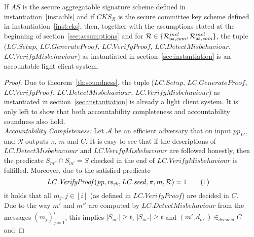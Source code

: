 \begin{theorem} 
If $\mathit{AS}$ is the secure aggregatable signature scheme defined in instantiation~\ref{insta:bls} and if 
$\mathit{CKS_{\mathcal{R}}}$ is the secure committee key scheme defined in instantiation~\ref{inst:cks}, then, together 
with the assumptions stated at the beginning of section~\ref{sec:assumptions} and for $\mathcal{R} \in \{ \mathcal{R}^{\mathit{incl}}_{\mathsf{ba},\mathit{com}}, \mathcal{R}^{\mathit{incl}}_{\mathsf{pa},\mathit{com}} \}$, the tuple 
($\mathit{LC.Setup}$, $\mathit{LC.GenerateProof}$, $\mathit{LC.VerifyProof}$, $\mathit{LC.DetectMisbehaviour}$, 
$\mathit{LC.VerifyMisbehaviour}$) as instantiated in section~\ref{sec:instantiation} is an accountable light client system.
\end{theorem}
\label{th:accountability_results}
\begin{proof}
\noindent Due to theorem~\ref{th:soundness}, the tuple 
($\mathit{LC.Setup}$, $\mathit{LC.GenerateProof}$, $\mathit{LC.VerifyProof}$, $\mathit{LC.DetectMisbehaviour}$, 
$\mathit{LC.VerifyMisbehaviour}$) as instantiated in section~\ref{sec:instantiation} is already a light client system. 
It is only left to show that both accountability completeness and accountability soundness also hold. \\
\noindent \textit{Accountability Completeness:} %
Let $\mathcal{A}$ be an efficient adversary that on input $\mathit{pp_{\mathit{LC}}}$ and $\mathcal{R}$ outputs 
 $\pi$, $m$ and $C$. It is easy to see that if the descriptions of $\mathit{LC.DetectMisbehaviour}$ and $\mathit{LC.VerifyMisbehaviour}$ are followed honestly,  
then the predicate $S_{m''} \cap S_{m'} = S$ checked in the end of $\mathit{LC.VerifyMisbehaviour}$ is fulfilled. Moreover, due to the satisfied predicate
$$\mathit{LC.VerifyProof}(\mathit{pp}, \mathit{rs_{\mathit{vk}}}, \LCseed, \pi, m, \mathcal{R}) = 1 \ \ \ \ \ \ (1)$$ %
it holds that all $m_j, j \in [i]$ (as defined in $\mathit{LC.VerifyProof}$) are decided in $C$. Due to the way $m'$ and $m''$ are computed 
by $\mathit{LC.DetectMisbehaviour}$ from the messages $(m_j)_{j=1}^i$, this implies $|S_{m'}| \geq t$, $|S_{m''}| \geq t$ and $(\mathit{m'}, d_{\mathit{m'}}) \in_{\mathit{decided}} C$ and 

\end{proof}
